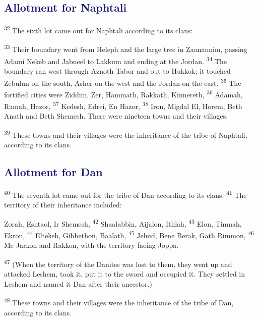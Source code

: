 \documentclass[12pt,twoside]{article}
\newcommand{\vs}[1]{\textsuperscript{#1}}
\begin{document}
\subsection*{\textcolor{MidnightBlue}{\textbf{Allotment for Naphtali}}}

\vs{32} The sixth lot came out for Naphtali according to its clans:

\begin{adjustwidth}{0.5cm}{0cm}
  \hspace{0.5cm}\vs{33} Their boundary went from Heleph and the large tree in Zaanannim, passing Adami Nekeb and Jabneel to Lakkum and ending at the Jordan.
  \vs{34} The boundary ran west through Aznoth Tabor and out to Hukkok; it touched Zebulun on the south, Asher on the west and the Jordan on the east.
  \vs{35} The fortified cities were Ziddim, Zer, Hammath, Rakkath, Kinnereth,
  \vs{36} Adamah, Ramah, Hazor,
  \vs{37} Kedesh, Edrei, En Hazor,
  \vs{38} Iron, Migdal El, Horem, Beth Anath and Beth Shemesh. There were nineteen towns and their villages.
\end{adjustwidth}

\noindent \vs{39} These towns and their villages were the inheritance of the tribe of Naphtali, according to its clans.

\subsection*{\textcolor{MidnightBlue}{\textbf{Allotment for Dan}}}

\vs{40} The seventh lot came out for the tribe of Dan according to its clans.
\vs{41} The territory of their inheritance included:

\begin{adjustwidth}{0.5cm}{0cm}
  \hspace{0.5cm}Zorah, Eshtaol, Ir Shemesh,
  \vs{42} Shaalabbin, Aijalon, Ithlah,
  \vs{43} Elon, Timnah, Ekron,
  \vs{44} Eltekeh, Gibbethon, Baalath,
  \vs{45} Jehud, Bene Berak, Gath Rimmon,
  \vs{46} Me Jarkon and Rakkon, with the territory facing Joppa.
\end{adjustwidth}

\noindent \vs{47} (When the territory of the Danites was lost to them, they went up and attacked Leshem, took it, put it to the sword and occupied it. They settled in Leshem and named it Dan after their ancestor.)

\noindent \vs{48} These towns and their villages were the inheritance of the tribe of Dan, according to its clans.
\end{document}
